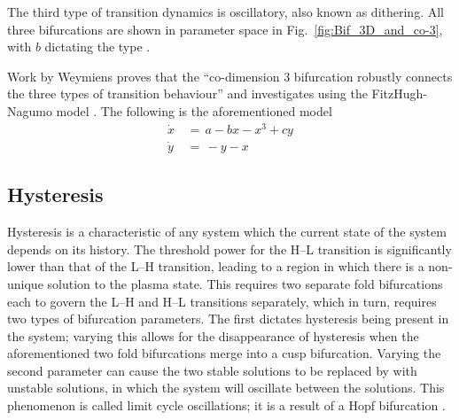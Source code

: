 The third type of transition dynamics is oscillatory, also known as dithering.
All three bifurcations are shown in parameter space in Fig.~\ref{fig:Bif_3D_and_co-3}, with $b$ dictating the type \cite{weymiens_bifurcation_2014}.

Work by Weymiens proves that the ``co-dimension 3 bifurcation robustly connects the three types of transition behaviour'' and investigates using the FitzHugh-Nagumo model \cite{weymiens_bifurcation_2014}.
The following is the aforementioned model
\begin{subequations}
\begin{align} %
	\dot{x} \,&=\, a - bx - x^3 + cy \\
	\dot{y} \,&=\, -y - x
\end{align}
	\label{eq:FitzHugh-Nagumo}
\end{subequations}

\subsection{Hysteresis}\label{sec:hysteresis}
Hysteresis is a characteristic of any system which the current state of the system depends on its history.
The threshold power for the H--L transition is significantly lower than that of the L--H transition, leading to a region in which there is a non-unique solution to the plasma state.
This requires two separate fold bifurcations each to govern the L--H and H--L transitions separately, which in turn, requires two types of bifurcation parameters.
The first dictates hysteresis being present in the system; varying this allows for the disappearance of hysteresis when the aforementioned two fold bifurcations merge into a cusp bifurcation.
Varying the second parameter can cause the two stable solutions to be replaced by with unstable solutions, in which the system will oscillate between the solutions.
This phenomenon is called limit cycle oscillations; it is a result of a Hopf bifurcation \cite{weymiens_bifurcation_2014}.

